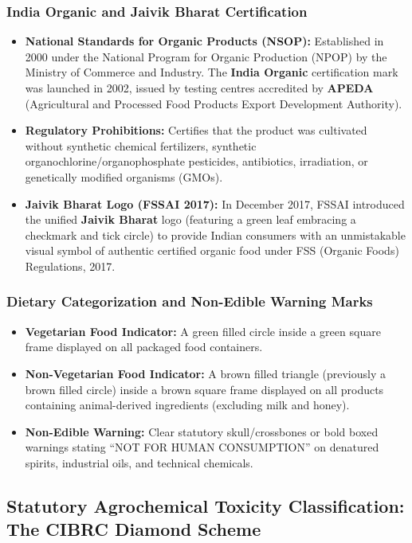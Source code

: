 \documentclass[11pt,a4paper,oneside]{article}
\begin{document}
\subsubsection{India Organic and Jaivik Bharat Certification}
\begin{itemize}[leftmargin=*]
    \item \textbf{National Standards for Organic Products (NSOP):} Established in 2000 under the National Program for Organic Production (NPOP) by the Ministry of Commerce and Industry. The \textbf{India Organic} certification mark was launched in 2002, issued by testing centres accredited by \textbf{APEDA} (Agricultural and Processed Food Products Export Development Authority).
    \item \textbf{Regulatory Prohibitions:} Certifies that the product was cultivated without synthetic chemical fertilizers, synthetic organochlorine/organophosphate pesticides, antibiotics, irradiation, or genetically modified organisms (GMOs).
    \item \textbf{Jaivik Bharat Logo (FSSAI 2017):} In December 2017, FSSAI introduced the unified \textbf{Jaivik Bharat} logo (featuring a green leaf embracing a checkmark and tick circle) to provide Indian consumers with an unmistakable visual symbol of authentic certified organic food under FSS (Organic Foods) Regulations, 2017.
\end{itemize}

\subsubsection{Dietary Categorization and Non-Edible Warning Marks}
\begin{itemize}[leftmargin=*]
    \item \textbf{Vegetarian Food Indicator:} A green filled circle inside a green square frame displayed on all packaged food containers.
    \item \textbf{Non-Vegetarian Food Indicator:} A brown filled triangle (previously a brown filled circle) inside a brown square frame displayed on all products containing animal-derived ingredients (excluding milk and honey).
    \item \textbf{Non-Edible Warning:} Clear statutory skull/crossbones or bold boxed warnings stating ``NOT FOR HUMAN CONSUMPTION'' on denatured spirits, industrial oils, and technical chemicals.
\end{itemize}

\subsection{Statutory Agrochemical Toxicity Classification: The CIBRC Diamond Scheme}
\end{document}
